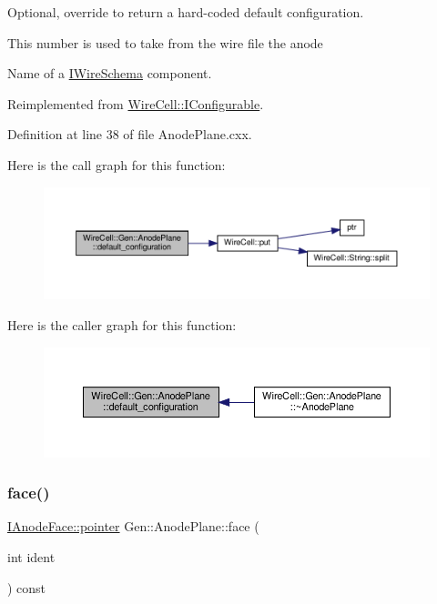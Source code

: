 Optional, override to return a hard-\/coded default configuration. 

This number is used to take from the wire file the anode

Name of a \hyperlink{class_wire_cell_1_1_i_wire_schema}{I\+Wire\+Schema} component. 

Reimplemented from \hyperlink{class_wire_cell_1_1_i_configurable_a54841b2da3d1ea02189478bff96f7998}{Wire\+Cell\+::\+I\+Configurable}.



Definition at line 38 of file Anode\+Plane.\+cxx.

Here is the call graph for this function\+:
\nopagebreak
\begin{figure}[H]
\begin{center}
\leavevmode
\includegraphics[width=350pt]{class_wire_cell_1_1_gen_1_1_anode_plane_acc2e184daee40976feb1b2a1b6171905_cgraph}
\end{center}
\end{figure}
Here is the caller graph for this function\+:
\nopagebreak
\begin{figure}[H]
\begin{center}
\leavevmode
\includegraphics[width=350pt]{class_wire_cell_1_1_gen_1_1_anode_plane_acc2e184daee40976feb1b2a1b6171905_icgraph}
\end{center}
\end{figure}
\mbox{\label{class_wire_cell_1_1_gen_1_1_anode_plane_a429403f80c922cd168213c049ecadeea}} 
\subsubsection{\texorpdfstring{face()}{face()}}
{\footnotesize\ttfamily \hyperlink{class_wire_cell_1_1_interface_a09c548fb8266cfa39afb2e74a4615c37}{I\+Anode\+Face\+::pointer} Gen\+::\+Anode\+Plane\+::face (\begin{DoxyParamCaption}\item[{int}]{ident }\end{DoxyParamCaption}) const\hspace{0.3cm}{\ttfamily [virtual]}}



